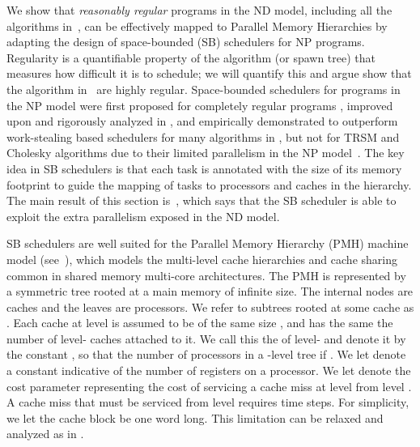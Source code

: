 
We show that {\it reasonably regular} programs in the ND model,
including all the algorithms in~, can be effectively
mapped to Parallel Memory Hierarchies by adapting the design of
space-bounded (SB) schedulers for NP programs. Regularity is a
quantifiable property of the algorithm (or spawn tree) that measures
how difficult it is to schedule; we will quantify this and argue show
that the algorithm in~ are highly regular.  Space-bounded
schedulers for programs in the NP model were first proposed for
completely regular programs \cite{ChowdhurySiBl13}, improved upon and
rigorously analyzed in \cite{BlellochFiGi11}, and empirically
demonstrated to outperform work-stealing based schedulers for many
algorithms in \cite{SimhadriBlFi14}, but not for TRSM and Cholesky
algorithms due to their limited parallelism in the NP
model~\cite{SimhadriBlFi15}. The key idea in SB schedulers is that
each task is annotated with the size of its memory footprint to guide
the mapping of tasks to processors and caches in the hierarchy.  The
main result of this section is~, which says that the SB
scheduler is able to exploit the extra parallelism exposed in the ND
model.

SB schedulers are well suited for the Parallel Memory Hierarchy (PMH)
machine model \cite{ACF93} (see~), which models the
multi-level cache hierarchies and cache sharing common in shared
memory multi-core architectures.  The PMH is represented by a
symmetric tree rooted at a main memory of infinite size. The internal
nodes are caches and the leaves are processors. We refer to subtrees
rooted at some cache as . Each cache at level  is
assumed to be of the same size , and has the same the number of
level- caches attached to it. We call this the 
of level- and denote it by the constant , so that the number
of processors in a -level tree if . We
let  denote a constant indicative of the number of registers on a
processor. We let  denote the cost parameter representing the
cost of servicing a cache miss at level  from level . A
cache miss that must be serviced from level  requires  time steps.  For simplicity, we let the cache
block be one word long.  This limitation can be relaxed and analyzed
as in \cite{BlellochFiGi11}.


